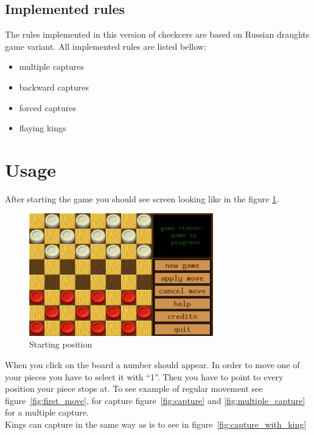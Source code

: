 \documentclass[12pt,a5paper]{article}
\begin{document}
\subsection{Implemented rules}
The rules implemented in this version of checkcers are based on Russian draughts game variant. All implemented rules are listed bellow: 
\begin{itemize}
	\item multiple captures
	\item backward captures
	\item forced captures
	\item flaying kings
\end{itemize}

\newpage
\section{Usage}

After starting the game you should see screen looking like in the figure \ref{fig:start}.

\begin{figure}[h]
	\centering
	\includegraphics[width=8cm]{img/starting_position.png}
	\caption{Starting position}
	\label{fig:start}
\end{figure}

When you click on the board a number should appear. In order to move one of your pieces you have to select it with “1”. Then you have to point to every position your piece stops at. To see example of regular movement see figure~\ref{fig:first_move}, for capture figure~\ref{fig:capture} and \ref{fig:multiple_capture} for a multiple capture.\\
Kings can capture in the same way as is to see in figure~\ref{fig:capture_with_king}
\end{document}
